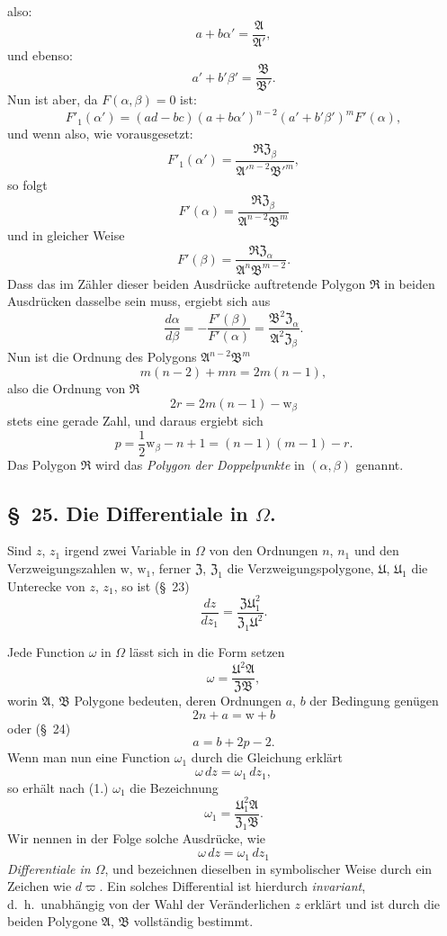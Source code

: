 \documentclass{article}
\begin{document}
also:
\[ a+b\alpha' = \frac{\mathfrak{A}}{\mathfrak{A}'}, \]
und ebenso:
\[ a'+b'\beta' = \frac{\mathfrak{B}}{\mathfrak{B}'}. \]
Nun ist aber, da $F(\alpha, \beta) = 0$ ist:
\[ F'_{1}(\alpha') = (ad-bc)(a+b\alpha')^{n-2}(a'+b'\beta')^{m}F'(\alpha), \]
und wenn also, wie vorausgesetzt:
\[ F'_{1}(\alpha') = \frac{\mathfrak{R}\mathfrak{Z}_{\beta}}{\mathfrak{A}'^{n-2}\mathfrak{B}'^{m}}, \]
so folgt
\[ F'(\alpha) = \frac{\mathfrak{R}\mathfrak{Z}_{\beta}}{\mathfrak{A}^{n-2}\mathfrak{B}^{m}} \]
und in gleicher Weise
\[ F'(\beta) = \frac{\mathfrak{R}\mathfrak{Z}_{\alpha}}{\mathfrak{A}^{n}\mathfrak{B}^{m-2}}. \]
Dass das im Zähler dieser beiden Ausdrücke auftretende Polygon $\mathfrak{R}$ in beiden Ausdrücken dasselbe sein muss, ergiebt sich aus
\[ \frac{d\alpha}{d\beta} = -\frac{F'(\beta)}{F'(\alpha)} = \frac{\mathfrak{B}^{2}\mathfrak{Z}_{\alpha}}{\mathfrak{A}^{2}\mathfrak{Z}_{\beta}}. \]
Nun ist die Ordnung des Polygons $\mathfrak{A}^{n-2}\mathfrak{B}^{m}$
\[ m(n-2)+mn = 2m(n-1), \]
also die Ordnung von $\mathfrak{R}$
\[ 2r = 2m(n-1)-\mathrm{w}_{\beta} \]
stets eine gerade Zahl, und daraus ergiebt sich
\[ p = \frac{1}{2}\mathrm{w}_{\beta}-n+1 = (n-1)(m-1)-r. \tag{3.} \]
Das Polygon $\mathfrak{R}$ wird das \emph{Polygon der Doppelpunkte} in $(\alpha, \beta)$ genannt.

\subsection*{§~25. Die Differentiale in $\Omega$.}

Sind $z$, $z_{1}$ irgend zwei Variable in $\Omega$ von den Ordnungen $n$, $n_{1}$ und den Verzweigungszahlen $\mathrm{w}$, $\mathrm{w}_{1}$, ferner $\mathfrak{Z}$, $\mathfrak{Z}_{1}$ die Verzweigungspolygone, $\mathfrak{U}$, $\mathfrak{U}_{1}$ die Unterecke von $z$, $z_{1}$, so ist (§~23)
\[ \frac{dz}{dz_{1}} = \frac{\mathfrak{Z}\mathfrak{U}_{1}^{2}}{\mathfrak{Z}_{1}\mathfrak{U}^{2}}. \tag{1.} \]

Jede Function $\omega$ in $\Omega$ lässt sich in die Form setzen
\[ \omega = \frac{\mathfrak{U}^{2}\mathfrak{A}}{\mathfrak{Z}\mathfrak{B}}, \tag{2.} \]
worin $\mathfrak{A}$, $\mathfrak{B}$ Polygone bedeuten, deren Ordnungen $a$, $b$ der Bedingung genügen
\[ 2n+a = \mathrm{w}+b \]
oder (§~24)
\[ a = b+2p-2. \tag{3.} \]
Wenn man nun eine Function $\omega_{1}$ durch die Gleichung erklärt
\[ \omega\,dz = \omega_{1}\,dz_{1}, \]
so erhält nach (1.) $\omega_{1}$ die Bezeichnung
\[ \omega_{1} = \frac{\mathfrak{U}_{1}^{2}\mathfrak{A}}{\mathfrak{Z}_{1}\mathfrak{B}}. \]
Wir nennen in der Folge solche Ausdrücke, wie
\[ \omega\,dz = \omega_{1}\,dz_{1} \]
\emph{Differentiale in $\Omega$}, und bezeichnen dieselben in symbolischer Weise durch ein Zeichen wie $d\varpi$. Ein solches Differential ist hierdurch \emph{invariant}, d.\ h.\ unabhängig von der Wahl der Veränderlichen $z$ erklärt und ist durch die beiden Polygone $\mathfrak{A}$, $\mathfrak{B}$ vollständig bestimmt.
\end{document}
